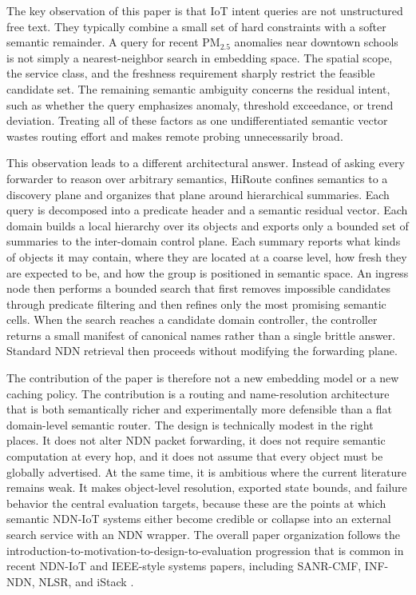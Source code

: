 \documentclass[journal]{IEEEtran}
\newcommand{\sysname}{HiRoute}
\begin{document}
The key observation of this paper is that IoT intent queries are not unstructured free text. They typically combine a small set of hard constraints with a softer semantic remainder. A query for recent PM$_{2.5}$ anomalies near downtown schools is not simply a nearest-neighbor search in embedding space. The spatial scope, the service class, and the freshness requirement sharply restrict the feasible candidate set. The remaining semantic ambiguity concerns the residual intent, such as whether the query emphasizes anomaly, threshold exceedance, or trend deviation. Treating all of these factors as one undifferentiated semantic vector wastes routing effort and makes remote probing unnecessarily broad.

This observation leads to a different architectural answer. Instead of asking every forwarder to reason over arbitrary semantics, \sysname{} confines semantics to a discovery plane and organizes that plane around hierarchical summaries. Each query is decomposed into a predicate header and a semantic residual vector. Each domain builds a local hierarchy over its objects and exports only a bounded set of summaries to the inter-domain control plane. Each summary reports what kinds of objects it may contain, where they are located at a coarse level, how fresh they are expected to be, and how the group is positioned in semantic space. An ingress node then performs a bounded search that first removes impossible candidates through predicate filtering and then refines only the most promising semantic cells. When the search reaches a candidate domain controller, the controller returns a small manifest of canonical names rather than a single brittle answer. Standard NDN retrieval then proceeds without modifying the forwarding plane.

The contribution of the paper is therefore not a new embedding model or a new caching policy. The contribution is a routing and name-resolution architecture that is both semantically richer and experimentally more defensible than a flat domain-level semantic router. The design is technically modest in the right places. It does not alter NDN packet forwarding, it does not require semantic computation at every hop, and it does not assume that every object must be globally advertised. At the same time, it is ambitious where the current literature remains weak. It makes object-level resolution, exported state bounds, and failure behavior the central evaluation targets, because these are the points at which semantic NDN-IoT systems either become credible or collapse into an external search service with an NDN wrapper. The overall paper organization follows the introduction-to-motivation-to-design-to-evaluation progression that is common in recent NDN-IoT and IEEE-style systems papers, including SANR-CMF, INF-NDN, NLSR, and iStack \cite{sanr,inf_ndn,nlsr,istack}.
\end{document}

